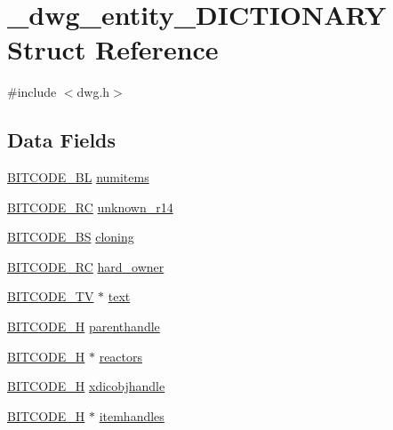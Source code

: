 \hypertarget{struct__dwg__entity__DICTIONARY}{\section{\-\_\-dwg\-\_\-entity\-\_\-\-D\-I\-C\-T\-I\-O\-N\-A\-R\-Y \-Struct \-Reference}
\label{struct__dwg__entity__DICTIONARY}
}


{\ttfamily \#include $<$dwg.\-h$>$}

\subsection*{\-Data \-Fields}
\begin{DoxyCompactItemize}
\item 
\hyperlink{dwg_8h_aebd5f127038868cbabc3d55d91da776c}{\-B\-I\-T\-C\-O\-D\-E\-\_\-\-B\-L} \hyperlink{struct__dwg__entity__DICTIONARY_a0fed3da460fbf3e3cc027ef206718745}{numitems}
\item 
\hyperlink{dwg_8h_a7fd199a8f9c9cc52bdab220f65a2a619}{\-B\-I\-T\-C\-O\-D\-E\-\_\-\-R\-C} \hyperlink{struct__dwg__entity__DICTIONARY_a390f1f4ea66c8fc2c9e5ae396f8a663f}{unknown\-\_\-r14}
\item 
\hyperlink{dwg_8h_a94297606fbd4a4ff97e8add284af0809}{\-B\-I\-T\-C\-O\-D\-E\-\_\-\-B\-S} \hyperlink{struct__dwg__entity__DICTIONARY_a02203169c1e687992cb2fe73e67e032f}{cloning}
\item 
\hyperlink{dwg_8h_a7fd199a8f9c9cc52bdab220f65a2a619}{\-B\-I\-T\-C\-O\-D\-E\-\_\-\-R\-C} \hyperlink{struct__dwg__entity__DICTIONARY_a83aff68cdcbde04d101ec1dc5a958fea}{hard\-\_\-owner}
\item 
\hyperlink{dwg_8h_a2a7e040c6e36ca039b03608679ecaf7c}{\-B\-I\-T\-C\-O\-D\-E\-\_\-\-T\-V} $\ast$ \hyperlink{struct__dwg__entity__DICTIONARY_ab9df054a445ddf1fa47a4f121fd126a6}{text}
\item 
\hyperlink{dwg_8h_a7c700e94e047a97ba8c24bdfe4029dc3}{\-B\-I\-T\-C\-O\-D\-E\-\_\-\-H} \hyperlink{struct__dwg__entity__DICTIONARY_a2ee204c1119dcde681bd6e1944615cc1}{parenthandle}
\item 
\hyperlink{dwg_8h_a7c700e94e047a97ba8c24bdfe4029dc3}{\-B\-I\-T\-C\-O\-D\-E\-\_\-\-H} $\ast$ \hyperlink{struct__dwg__entity__DICTIONARY_a91c6b2af1296e29626797d02386af2ef}{reactors}
\item 
\hyperlink{dwg_8h_a7c700e94e047a97ba8c24bdfe4029dc3}{\-B\-I\-T\-C\-O\-D\-E\-\_\-\-H} \hyperlink{struct__dwg__entity__DICTIONARY_a7be0ceeaadd64bb556f1e6557ed7381c}{xdicobjhandle}
\item 
\hyperlink{dwg_8h_a7c700e94e047a97ba8c24bdfe4029dc3}{\-B\-I\-T\-C\-O\-D\-E\-\_\-\-H} $\ast$ \hyperlink{struct__dwg__entity__DICTIONARY_a29deb9b03000a2802e8603419710907f}{itemhandles}
\end{DoxyCompactItemize}


